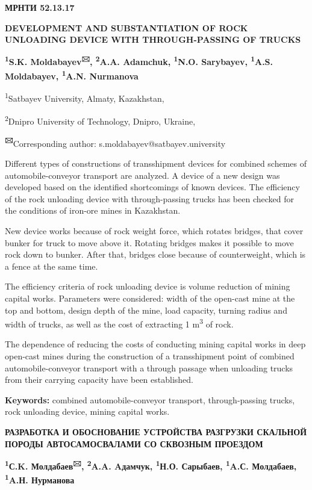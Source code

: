 \newpage
{\bfseries МРНТИ 52.13.17}

{\bfseries DEVELOPMENT AND SUBSTANTIATION OF ROCK UNLOADING DEVICE WITH
THROUGH-PASSING OF TRUCKS}

{\bfseries \textsuperscript{1}S.K. Moldabayev\textsuperscript{🖂},
\textsuperscript{2}A.A. Adamchuk, \textsuperscript{1}N.O. Sarybayev,
\textsuperscript{1}A.S. Moldabayev, \textsuperscript{1}A.N. Nurmanova}

\textsuperscript{1}Satbayev University, Almaty, Kazakhstan,

\textsuperscript{2}Dnipro University of Technology, Dnipro, Ukraine,

{\bfseries \textsuperscript{🖂}}Corresponding author:
s.moldabayev@satbayev.university

Different types of constructions of transshipment devices for combined
schemes of automobile-conveyor transport are analyzed. A device of a new
design was developed based on the identified shortcomings of known
devices. The efficiency of the rock unloading device with
through-passing trucks has been checked for the conditions of iron-ore
mines in Kazakhstan.

New device works because of rock weight force, which rotates bridges,
that cover bunker for truck to move above it. Rotating bridges makes it
possible to move rock down to bunker. After that, bridges close because
of counterweight, which is a fence at the same time.

The efficiency criteria of rock unloading device is volume reduction of
mining capital works. Parameters were considered: width of the open-cast
mine at the top and bottom, design depth of the mine, load capacity,
turning radius and width of trucks, as well as the cost of extracting 1
m\textsuperscript{3} of rock.

The dependence of reducing the costs of conducting mining capital works
in deep open-cast mines during the construction of a transshipment point
of combined automobile-conveyor transport with a through passage when
unloading trucks from their carrying capacity have been established.

{\bfseries Keywords:} combined automobile-conveyor transport,
through-passing trucks, rock unloading device, mining capital works.

{\bfseries РАЗРАБОТКА И ОБОСНОВАНИЕ УСТРОЙСТВА РАЗГРУЗКИ СКАЛЬНОЙ ПОРОДЫ
АВТОСАМОСВАЛАМИ СО СКВОЗНЫМ ПРОЕЗДОМ}

{\bfseries \textsuperscript{1}С.K. Молдабаев\textsuperscript{🖂},
\textsuperscript{2}A.A. Aдамчук, \textsuperscript{1}Н.О. Сарыбаев,
\textsuperscript{1}A.С. Молдабаев, \textsuperscript{1}A.Н. Нурманова}

